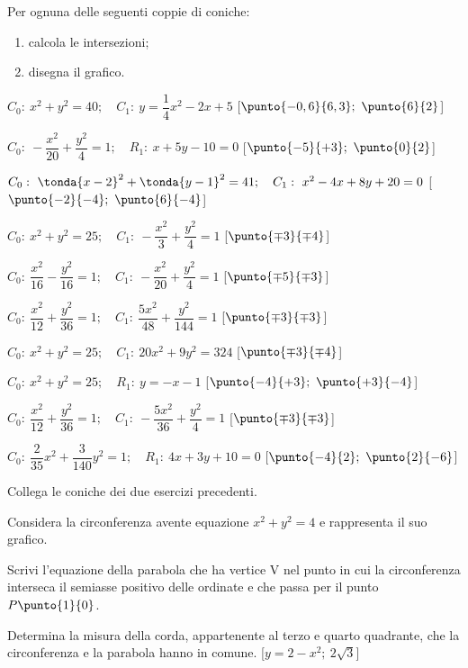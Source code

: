 \begin{esercizio}\label{ese:03.1}
Per ognuna delle seguenti coppie di coniche:
\begin{enumerate} [nosep]
 \item calcola le intersezioni;
 \item disegna il grafico.
\end{enumerate}

 \begin{enumeratea}
  \item  \(C_0:~x^2+y^2=40; \quad C_1:~y=\dfrac{1}{4}x^2 -2x+5\)
  \hfill [\(\punto{-0,6}{6,3};~\punto{6}{2}\)]
  \item  \(C_0:~-\dfrac{x^2}{20} + \dfrac{y^2}{4}=1; \quad 
           R_1:~x+5y-10=0\)
  \hfill [\(\punto{-5}{+3};~\punto{0}{2}\)]
  \item  \(C_0:~\tonda{x-2}^2+\tonda{y-1}^2=41; \quad C_1:~x^2-4x+8y+20=0\)
  \hfill [\(\punto{-2}{-4};~\punto{6}{-4}\)]
  \item  \(C_0:~x^2+y^2=25; \quad C_1:~-\dfrac{x^2}{3} + \dfrac{y^2}{4}=1\)
  \hfill [\(\punto{\mp 3}{\mp 4}\)]
  \item  \(C_0:~\dfrac{x^2}{16} - \dfrac{y^2}{16}=1; \quad 
           C_1:~-\dfrac{x^2}{20} + \dfrac{y^2}{4}=1\)
  \hfill [\(\punto{\mp 5}{\mp 3}\)]
  \item  \(C_0:~\dfrac{x^2}{12} + \dfrac{y^2}{36}=1; \quad 
           C_1:~\dfrac{5x^2}{48} + \dfrac{y^2}{144}=1\)
  \hfill [\(\punto{\mp 3}{\mp 3}\)]
  \item  \(C_0:~x^2+y^2=25; \quad C_1:~20x^2+9y^2=324\)
  \hfill [\(\punto{\mp 3}{\mp 4}\)]
  \item  \(C_0:~x^2+y^2=25; \quad R_1:~y=-x-1\)
  \hfill [\(\punto{-4}{+3};~\punto{+3}{-4}\)]
  \item  \(C_0:~\dfrac{x^2}{12} + \dfrac{y^2}{36}=1; \quad 
           C_1:~-\dfrac{5x^2}{36} + \dfrac{y^2}{4}=1\)
  \hfill [\(\punto{\mp 3}{\mp 3}\)]
  \item  \(C_0:~\dfrac{2}{35}x^2 + \dfrac{3}{140}y^2=1; \quad 
           R_1:~4x+3y+10=0\)
  \hfill [\(\punto{-4}{2};~\punto{2}{-6}\)]
 \end{enumeratea}
\end{esercizio}

\begin{esercizio}\label{ese:03.1}
Collega le coniche dei due esercizi precedenti.
\end{esercizio}
\begin{esercizio}\label{ese:03.1}
Considera la circonferenza avente equazione \quad \(x^2+y^2=4\) \quad e 
rappresenta il suo grafico.
\begin{enumeratea}
\item Scrivi l’equazione della parabola che ha vertice V nel punto in 
cui la circonferenza interseca il semiasse positivo delle ordinate e che 
passa per il punto \(P \punto{1}{0}\). 
\item Determina la misura della corda, appartenente al terzo e quarto 
quadrante, che la circonferenza e la parabola hanno in comune.
\hfill [\(y=2-x^2;~2\sqrt{3}\)]
\end{enumeratea}
\end{esercizio}

